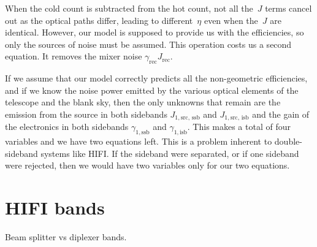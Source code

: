 When the cold count is subtracted from the hot count, not all the~$J$ terms cancel out as the optical paths differ, leading to different~$\eta$ even when the~$J$ are identical.
However, our model is supposed to provide us with the efficiencies, so only the sources of noise must be assumed.
This operation costs us a second equation.
It removes the mixer noise $\gamma_\text{rec} J_\text{rec}$.

If we assume that our model correctly predicts all the non-geometric efficiencies, and if we know the noise power emitted by the various optical elements of the telescope and the blank sky, then the only unknowns that remain are the emission from the source in both sidebands
$J_{1,\text{src, ssb}}$ and $J_{1,\text{src, isb}}$
and the gain of the electronics in both sidebands
$\gamma_{1,\text{ssb}}$ and $\gamma_{1,\text{isb}}$.
This makes a total of four variables and we have two equations left.
This is a problem inherent to double-sideband systems like HIFI.
If the sideband were separated, or if one sideband were rejected, then we would have two variables only for our two equations.







\section{HIFI bands}
\label{sec:hifi_bands}
Beam splitter vs diplexer bands.
